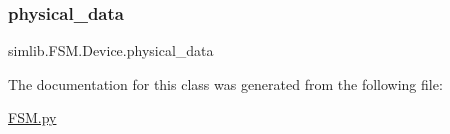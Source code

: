 \subsubsection{\texorpdfstring{physical\+\_\+data}{physical\_data}}
{\footnotesize\ttfamily simlib.\+F\+S\+M.\+Device.\+physical\+\_\+data}



The documentation for this class was generated from the following file\+:\begin{DoxyCompactItemize}
\item 
\mbox{\hyperlink{_f_s_m_8py}{F\+S\+M.\+py}}\end{DoxyCompactItemize}
